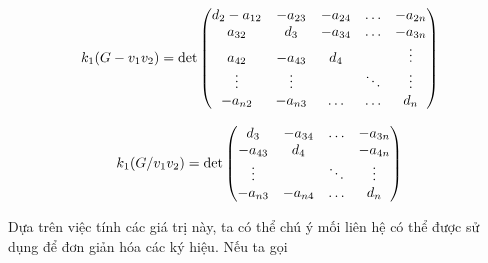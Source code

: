\documentclass[14pt, a4paper]{article}
\numberwithin{equation}{section}
\numberwithin{figure}{section}
\numberwithin{dl}{section}
\numberwithin{md}{section}
\numberwithin{bd}{section}
\numberwithin{dn}{section}
\numberwithin{hq}{section}
\begin{document}
    \begin{equation}
        k_1(G - v_1 v_2) = \det\begin{pmatrix}
            d_2 - a_{12} & - a_{23} & - a_{24} & \hdots & - a_{2n} \\
            a_{32} & d_3 & - a_{34} & \hdots & - a_{3n} \\
            a_{42} & - a_{43} & d_4 & \thickspace & \vdots \\
            \vdots & \vdots & \thickspace & \ddots & \vdots \\
            - a_{n2} & - a_{n3} & \hdots & \hdots & d_n
        \end{pmatrix}
    \end{equation}

    \begin{equation}
        k_1 (G / v_1 v_2) = \det\begin{pmatrix}
            d_3 & - a_{34} & \hdots & - a_{3n} \\
            - a_{43} & d_4 & \thickspace & - a_{4n} \\
            \vdots & \thickspace & \ddots & \vdots \\
            - a_{n3} & - a_{n4} & \hdots & d_n 
        \end{pmatrix}
    \end{equation}

    Dựa trên việc tính các giá trị này, ta có thể chú ý mối liên hệ có thể được sử dụng để đơn giản hóa các ký hiệu.
    Nếu ta gọi

    \newpage
    \printbibliography[title={TÀI LIỆU THAM KHẢO}]
\end{document}
